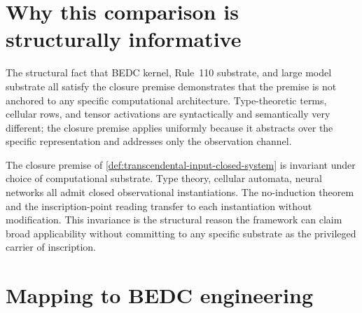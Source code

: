 \section{Why this comparison is structurally informative}
\label{sec:large-model-why-informative}

\begin{remark}
\label{rem:large-model-three-substrates-one-premise}
The structural fact that BEDC kernel, Rule~110 substrate, and large model substrate all satisfy the closure premise demonstrates that the premise is not anchored to any specific computational architecture. Type-theoretic terms, cellular rows, and tensor activations are syntactically and semantically very different; the closure premise applies uniformly because it abstracts over the specific representation and addresses only the observation channel.
\end{remark}

\begin{principle}
\label{prin:large-model-closure-substrate-independent}
The closure premise of \autoref{def:transcendental-input-closed-system} is invariant under choice of computational substrate. Type theory, cellular automata, neural networks all admit closed observational instantiations. The no-induction theorem and the inscription-point reading transfer to each instantiation without modification. This invariance is the structural reason the framework can claim broad applicability without committing to any specific substrate as the privileged carrier of inscription.
\end{principle}

\section{Mapping to BEDC engineering}
\label{sec:large-model-mapping-engineering}

